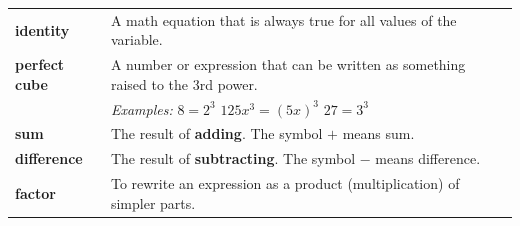 \documentclass[11pt]{article}
\begin{document}
\vspace{20pt}

\begin{tcolorbox}[colback=white, colframe=darkrule, boxrule=1pt, title={\color{white}\bfseries Key Vocabulary}, fonttitle=\large, coltitle=white, colbacktitle=darkrule, left=8pt, right=8pt, top=6pt, bottom=6pt]
\renewcommand{\arraystretch}{1.5}
\begin{tabular}{>{\bfseries}p{3cm} p{11.5cm}}
identity & A math equation that is always true for all values of the variable. \\
perfect cube & A number or expression that can be written as something raised to the 3rd power.\\
 & \textit{Examples:} $8 = 2^3$ \qquad $125x^3 = (5x)^3$ \qquad $27 = 3^3$ \\
sum & The result of \textbf{adding}. The symbol $+$ means sum. \\
difference & The result of \textbf{subtracting}. The symbol $-$ means difference. \\
factor & To rewrite an expression as a product (multiplication) of simpler parts. \\
\end{tabular}
\end{tcolorbox}
\end{document}
